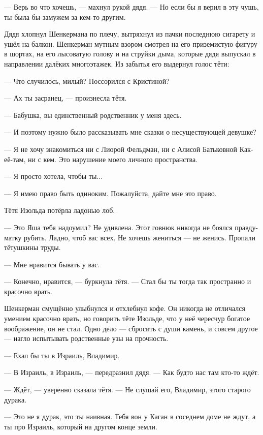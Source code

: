 \documentclass[a5paper,12pt,fleqn]{extbook}\usepackage{cooltooltips}\usepackage{polyglossia}\setdefaultlanguage[babelshorthands=true]{russian}\setotherlanguage{english}\defaultfontfeatures{Ligatures=TeX,Mapping=tex-text} \usepackage{xcolor}\definecolor{lightgray}{HTML}{bbbbbb}\color{lightgray}\newcommand{\ml}[3]{\textenglish{\textcolor{black}{#3}}}
\newcommand{\asterism}{\vspace{1em}{\centering\Large\bfseries$\ast~\ast~\ast$\par}\vspace{1em}}
\newcommand{\textspace}{\vspace{1em}{\centering\Large\bfseries<...>\par}\vspace{1em}}
\begin{document}
--- Верь во что хочешь, --- махнул рукой дядя.
--- Но если бы я верил в эту чушь, ты была бы замужем за кем-то другим.

Дядя хлопнул Шенкермана по плечу, вытряхнул из пачки последнюю сигарету и ушёл на балкон.
Шенкерман мутным взором смотрел на его приземистую фигуру в шортах, на его лысоватую голову и на струйки дыма, которые дядя выпускал в направлении далёких многоэтажек.
Из забытья его выдернул голос тёти:

--- Что случилось, милый?
Поссорился с Кристиной?

\asterism

--- Ах ты засранец, --- произнесла тётя.

--- Бабушка, вы единственный родственник у меня здесь.

--- И поэтому нужно было рассказывать мне сказки о несуществующей девушке?

--- Я не хочу знакомиться ни с Лиорой Фельдман, ни с Алисой Батьковной Как-её-там, ни с кем.
Это нарушение моего личного пространства.

--- Я просто хотела, чтобы ты...

--- Я имею право быть одиноким.
Пожалуйста, дайте мне это право.

Тётя Изольда потёрла ладонью лоб.

--- Это Яша тебя надоумил?
Не удивлена.
Этот говнюк никогда не боялся правду-матку рубить.
Ладно, чтоб вас всех.
Не хочешь жениться --- не женись.
Пропали тётушкины труды.

--- Мне нравится бывать у вас.

--- Конечно, нравится, --- буркнула тётя.
--- Стал бы ты тогда так пространно и красочно врать.

Шенкерман смущённо улыбнулся и отхлебнул кофе.
Он никогда не отличался умением красочно врать, но говорить тёте Изольде, что у неё чересчур богатое воображение, он не стал.
Одно дело --- сбросить с души камень, и совсем другое --- нагло испытывать родственные узы на прочность.

\textspace

--- Ехал бы ты в Израиль, Владимир.

--- В Израиль, в Израиль, --- передразнил дядя.
--- Как будто нас там кто-то ждёт.

--- Ждёт, --- уверенно сказала тётя.
--- Не слушай его, Владимир, этого старого дурака.

--- Это не я дурак, это ты наивная.
Тебя вон у Каган в соседнем доме не ждут, а ты про Израиль, который на другом конце земли.
\end{document}
